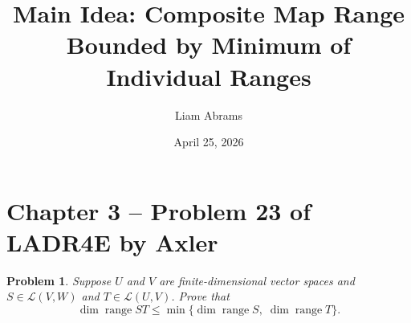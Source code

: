 \documentclass[12pt]{article}
\title{Main Idea: Composite Map Range Bounded by Minimum of Individual Ranges}
\author{Liam Abrams}
\date{April 25, 2026}
\newtheorem*{problem}{Problem}
\theoremstyle{remark}
\begin{document}
\maketitle
 
\section*{Chapter 3 -- Problem 23 of LADR4E by Axler}
 
\begin{problem}
Suppose $U$ and $V$ are finite-dimensional vector spaces and $S \in \mathcal{L}(V, W)$
and $T \in \mathcal{L}(U, V)$. Prove that
\[
    \dim \operatorname{range} ST \leq
    \min\{\dim \operatorname{range} S,\; \dim \operatorname{range} T\}.
\]
\end{problem}
 
\end{document}
